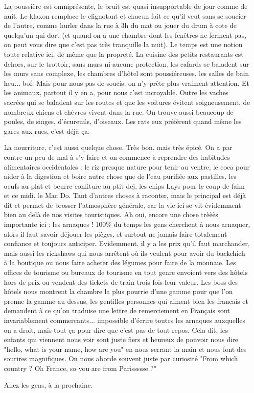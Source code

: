 \begin{multicols}{2}
La poussière est omniprésente, le bruit est quasi insupportable de jour comme de nuit. Le klaxon remplace le clignotant et chacun fait ce qu'il veut sans se soucier de l'autre, comme hurler dans la rue à 3h du mat ou jouer du drum à cote de quelqu'un qui dort (et quand on a une chambre dont les fenêtres ne ferment pas, on peut vous dire que c'est pas très tranquille la nuit). Le temps est une notion toute relative ici, de même que la propreté. La cuisine des petits restaurants est dehors, sur le trottoir, sans murs ni aucune protection, les cafards se baladent sur les murs sans complexe, les chambres d'hôtel sont poussiéreuses, les salles de bain heu... bof. Mais pour nous pas de soucis, on n'y prête plus vraiment attention. Et les animaux, partout il y en a, pour nous c'est incroyable. Outre les vaches sacrées qui se baladent sur les routes et que les voitures évitent soigneusement, de nombreux chiens et chèvres vivent dans la rue. On trouve aussi beaucoup de poules, de singes, d'écureuils, d'oiseaux. Les rats eux préfèrent quand même les gares aux rues, c'est déjà ça.

La nourriture, c'est aussi quelque chose. Très bon, mais très épicé. On a par contre un peu de mal à s'y faire et on commence à reprendre des habitudes alimentaires occidentales : le riz presque nature pour tenir au ventre, le coca pour aider à la digestion et boire autre chose que de l'eau purifiée aux pastilles, les oeufs au plat et beurre confiture au ptit dej, les chips Lays pour le coup de faim et ce midi, le Mac Do. Tant d'autres choses à raconter, mais le principal est déjà dit et permet de brosser l'atmosphère générale, car la vie ici se vit évidemment bien au delà de nos visites touristiques. Ah oui, encore une chose trèèès importante ici : les arnaques ! 100\% du temps les gens cherchent à nous arnaquer, alors il faut savoir déjouer les pièges, et surtout ne jamais faire totalement confiance et toujours anticiper. Evidemment, il y a les prix qu'il faut marchander, mais aussi les rickshaws qui nous arrêtent où ils veulent pour avoir du backchich à la boutique ou nous faire acheter des légumes pour faire de la monnaie. Les offices de tourisme ou bureaux de tourisme en tout genre envoient vers des hôtels hors de prix ou vendent des tickets de train trois fois leur valeur. Les boss des hôtels nous montrent la chambre la plus pourrie d'une gamme pour que l'on prenne la gamme au dessus, les gentilles personnes qui aiment bien les francais et demandent à ce qu'on traduise une lettre de remerciement en Français sont invariablement commercants... impossible d'écrire toutes les arnaques auxquelles on a droit, mais tout ça pour dire que c'est pas de tout repos. Cela dit, les enfants qui viennent nous voir sont juste fiers et heureux de pouvoir nous dire "hello, what is your name, how are you" en nous serrant la main et nous font des sourires magnifiques. On nous aborde souvent juste par curiosité "From which country ? Oh France, so you are from Parissssse ?"

%
Allez les gens, à la prochaine.

\end{multicols}


